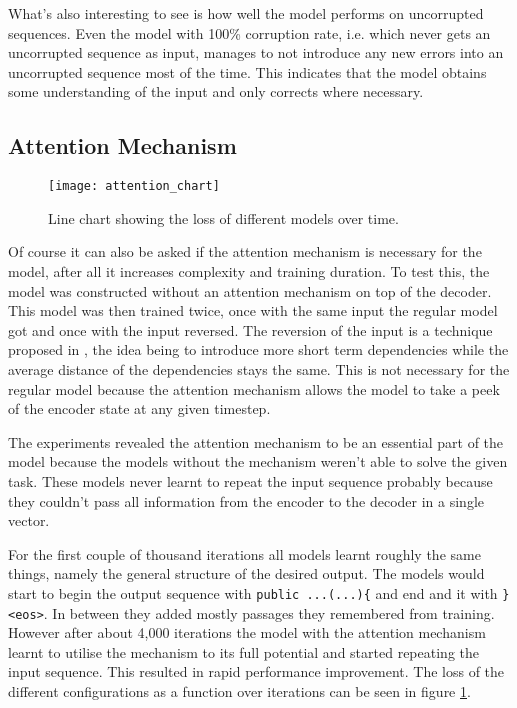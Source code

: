 What's also interesting to see is how well the model performs on uncorrupted sequences. Even the model with 100\% corruption rate, i.e. which never gets an uncorrupted sequence as input, manages to not introduce any new errors into an uncorrupted sequence most of the time. This indicates that the model obtains some understanding of the input and only corrects where necessary.

\subsection{Attention Mechanism}

\begin{figure}[p]
\centering
\texttt{[image: attention\_chart]}
\caption{Line chart showing the loss of different models over time.}
\label{attention_chart}
\end{figure}

Of course it can also be asked if the attention mechanism is necessary for the model, after all it increases complexity and training duration. To test this, the model was constructed without an attention mechanism on top of the decoder. This model was then trained twice, once with the same input the regular model got and once with the input reversed. The reversion of the input is a technique proposed in \cite{seq2seq}, the idea being to introduce more short term dependencies while the average distance of the dependencies stays the same. This is not necessary for the regular model because the attention mechanism allows the model to take a peek of the encoder state at any given timestep.

The experiments revealed the attention mechanism to be an essential part of the model because the models without the mechanism weren't able to solve the given task. These models never learnt to repeat the input sequence probably because they couldn't pass all information from the encoder to the decoder in a single vector.

For the first couple of thousand iterations all models learnt roughly the same things, namely the general structure of the desired output. The models would start to begin the output sequence with \texttt{public ...(...)\{} and end and it with \texttt{\}<eos>}. In between they added mostly passages they remembered from training. However after about 4,000 iterations the model with the attention mechanism learnt to utilise the mechanism to its full potential and started repeating the input sequence. This resulted in rapid performance improvement. The loss of the different configurations as a function over iterations can be seen in figure \ref{attention_chart}.

